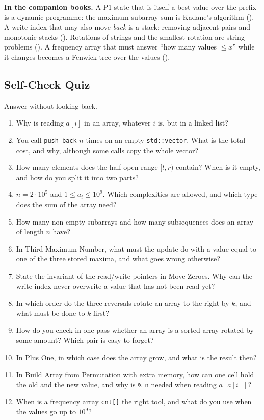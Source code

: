\noindent\textbf{In the companion books.} A P1 state that is itself a best value over the prefix is a dynamic programme: the maximum subarray sum is Kadane's algorithm (). A write index that may also move \emph{back} is a stack: removing adjacent pairs and monotonic stacks (). Rotations of strings and the smallest rotation are string problems (). A frequency array that must answer ``how many values $\le x$'' while it changes becomes a Fenwick tree over the values ().

\subsection{Self-Check Quiz}

Answer without looking back.
\begin{enumerate}[leftmargin=*]
    \item Why is reading $a[i]$  in an array, whatever $i$ is, but  in a linked list?
    \item You call \texttt{push\_back} $n$ times on an empty \texttt{std::vector}. What is the total cost, and why, although some calls copy the whole vector?
    \item How many elements does the half-open range $[l, r)$ contain? When is it empty, and how do you split it into two parts?
    \item $n = 2 \cdot 10^5$ and $1 \le a_i \le 10^9$. Which complexities are allowed, and which type does the sum of the array need?
    \item How many non-empty subarrays and how many subsequences does an array of length $n$ have?
    \item In Third Maximum Number, what must the update do with a value equal to one of the three stored maxima, and what goes wrong otherwise?
    \item State the invariant of the read/write pointers in Move Zeroes. Why can the write index never overwrite a value that has not been read yet?
    \item In which order do the three reversals rotate an array to the right by $k$, and what must be done to $k$ first?
    \item How do you check in one pass whether an array is a sorted array rotated by some amount? Which pair is easy to forget?
    \item In Plus One, in which case does the array grow, and what is the result then?
    \item In Build Array from Permutation with  extra memory, how can one cell hold the old and the new value, and why is \texttt{\% n} needed when reading $a[a[i]]$?
    \item When is a frequency array \texttt{cnt[]} the right tool, and what do you use when the values go up to $10^9$?
\end{enumerate}

